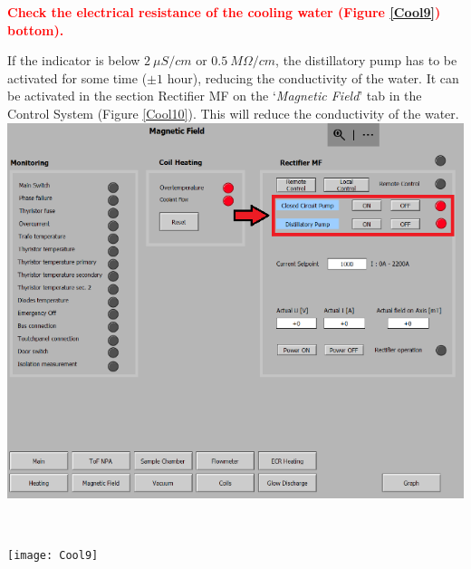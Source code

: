 \documentclass[fleqn,a4paper,20pt]{article}
\begin{document}
\textcolor{red}{\textbf{Check the electrical resistance of the cooling water (Figure \ref{Cool9}) bottom).}}\\

\begin{minipage}{.58\textwidth}

If the indicator is below $ 2\ \mu S/cm$ or $0.5\ M\Omega /cm$, the distillatory pump has to be activated for some time ($\pm 1$ hour), reducing the conductivity of the water. It can be activated in the section Rectifier MF on the `\textit{Magnetic Field}' tab in the Control System (Figure \ref{Cool10}). This will reduce the conductivity of the water. \\

	\includegraphics[width=\linewidth]{Cool10}
	\label{Cool10}
\end{minipage}
\begin{minipage}{.02\textwidth}
	$\ $\\
\end{minipage}
\begin{minipage}{.4\textwidth}


	\texttt{[image: Cool9]}
	\captionsetup{width=0.75\textwidth}
	\label{Cool9}
\end{minipage}
\vspace*{0.5cm}
\end{document}
